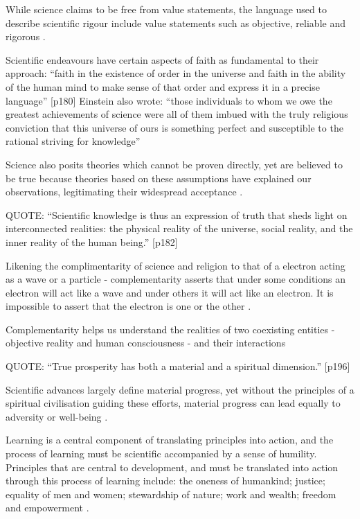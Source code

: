 While science claims to be free from value statements, the language used to describe scientific rigour include value statements such as objective, reliable and rigorous \citep{Arbab2000}.

Scientific endeavours have certain aspects of faith as fundamental to their approach: “faith in the existence of order in the universe and faith in the ability of the human mind to make sense of that order and express it in a precise language” [p180] Einstein also wrote: “those individuals to whom we owe the greatest achievements of science were all of them imbued with the truly religious conviction that this universe of ours is something perfect and susceptible to the rational striving for knowledge” \citep{Arbab2000}

Science also posits theories which cannot be proven directly, yet are believed to be true because theories based on these assumptions have explained our observations, legitimating their widespread acceptance \citep{Arbab2000}.


QUOTE: “Scientific knowledge is thus an expression of truth that sheds light on interconnected realities: the physical reality of the universe, social reality, and the inner reality of the human being.” [p182] \citep{Arbab2000}


Likening the complimentarity of science and religion to that of a electron acting as a wave or a particle - complementarity asserts that under some conditions an electron will act like a wave and under others it will act like an electron. It is impossible to assert that the electron is one or the other \citep{Arbab2000}.

Complementarity helps us understand the realities of two coexisting entities - objective reality and human consciousness - and their interactions \citep{Arbab2000}

QUOTE: “True prosperity has both a material and a spiritual dimension.” [p196] \citep{Arbab2000}


Scientific advances largely define material progress, yet without the principles of a spiritual civilisation guiding these efforts, material progress can lead equally to adversity or well-being \citep{Arbab2000}.

Learning is a central component of translating principles into action, and the process of learning must be scientific accompanied by a sense of humility. Principles that are central to development, and must be translated into action through this process of learning include: the oneness of humankind; justice; equality of men and women; stewardship of nature; work and wealth; freedom and empowerment \citep{Arbab2000}.

